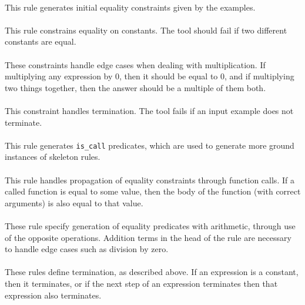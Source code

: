  
\mbox{} \\
This rule generates initial equality constraints given by the examples.  \\

 
\mbox{} \\
This rule constrains equality on constants. The tool should fail if two different constants are equal. \\

 
\mbox{} \\
These constraints handle edge cases when dealing with multiplication. If multiplying any expression by 0, then it should be equal to 0, and if multiplying two things together, then the answer should be a multiple of them both. \\

 
\mbox{} \\
This constraint handles termination. The tool fails if an input example does not terminate.\\

 
\mbox{} \\
This rule generates \lstinline{is_call} predicates, which are used to generate more ground instances of skeleton rules. \\ %

 
\mbox{} \\
This rule handles propagation of equality constraints through function calls. If a called function is equal to some value, then the body of the function (with correct arguments) is also equal to that value. \\

 
\mbox{} \\
These rule specify generation of equality predicates with arithmetic, through use of the opposite operations. Addition terms in the head of the rule are necessary to handle edge cases such as division by zero. \\

 
\mbox{} \\
These rules define termination, as described above. If an expression is a constant, then it terminates, or if the next step of an expression terminates then that expression also terminates. \\

